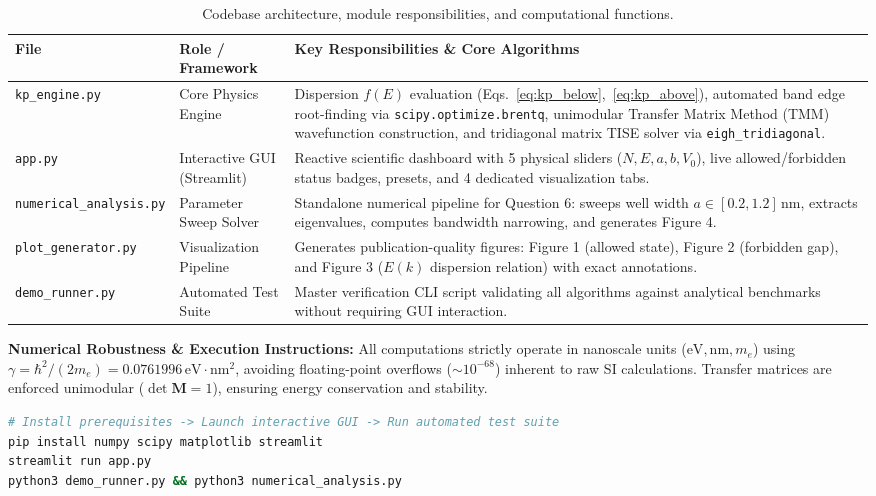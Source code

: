 \documentclass[10pt, a4paper]{article}
\begin{document}
\begin{table}[H]
\centering\footnotesize
\caption{Codebase architecture, module responsibilities, and computational functions.}
\label{tab:code}
\begin{tabular}{p{3.8cm}p{3.0cm}p{9.4cm}}
\toprule
\textbf{File} & \textbf{Role / Framework} & \textbf{Key Responsibilities \& Core Algorithms} \\
\midrule
\texttt{kp\_engine.py} & Core Physics Engine & Dispersion $f(E)$ evaluation (Eqs.~\ref{eq:kp_below},~\ref{eq:kp_above}), automated band edge root-finding via \texttt{scipy.optimize.brentq}, unimodular Transfer Matrix Method (TMM) wavefunction construction, and tridiagonal matrix TISE solver via \texttt{eigh\_tridiagonal}. \\
\texttt{app.py} & Interactive GUI (Streamlit) & Reactive scientific dashboard with 5 physical sliders ($N, E, a, b, V_0$), live allowed/forbidden status badges, presets, and 4 dedicated visualization tabs. \\
\texttt{numerical\_analysis.py} & Parameter Sweep Solver & Standalone numerical pipeline for Question 6: sweeps well width $a \in [0.2, 1.2]\,\text{nm}$, extracts eigenvalues, computes bandwidth narrowing, and generates Figure 4. \\
\texttt{plot\_generator.py} & Visualization Pipeline & Generates publication-quality figures: Figure 1 (allowed state), Figure 2 (forbidden gap), and Figure 3 ($E(k)$ dispersion relation) with exact annotations. \\
\texttt{demo\_runner.py} & Automated Test Suite & Master verification CLI script validating all algorithms against analytical benchmarks without requiring GUI interaction. \\
\bottomrule
\end{tabular}
\end{table}

\textbf{Numerical Robustness \& Execution Instructions:}
All computations strictly operate in nanoscale units ($\text{eV}, \text{nm}, m_e$) using $\gamma = \hbar^2/(2m_e) = 0.0761996\,\text{eV}\cdot\text{nm}^2$, avoiding floating-point overflows ($\sim 10^{-68}$) inherent to raw SI calculations. Transfer matrices are enforced unimodular ($\det\mathbf{M} = 1$), ensuring energy conservation and stability.
\begin{lstlisting}[language=bash]
# Install prerequisites -> Launch interactive GUI -> Run automated test suite
pip install numpy scipy matplotlib streamlit
streamlit run app.py
python3 demo_runner.py && python3 numerical_analysis.py
\end{lstlisting}
\end{document}
